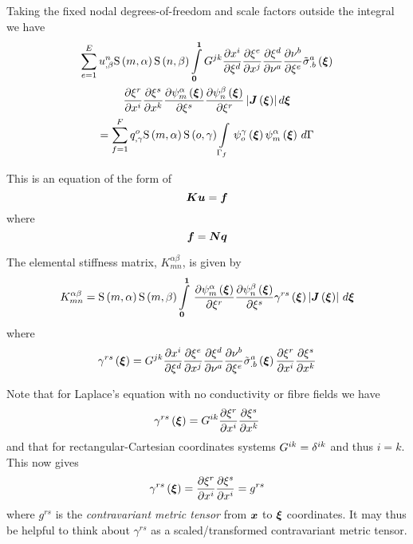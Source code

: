 Taking the fixed nodal degrees-of-freedom and scale factors outside the integral we have
\begin{multline}
  \dsum_{e=1}^{E}\nodedof{u}{n}{\beta}\gsf{m}{\alpha}\gsf{n}{\beta}
  \dintl{\vectr{0}}{\vectr{1}}G^{jk}\delby{x^{i}}{\xi^{d}}
  \delby{\xi^{e}}{x^{j}}\delby{\xi^{d}}{\nu^{a}}
  \delby{\nu^{b}}{\xi^{e}}\fnof{{\tilde{\sigma}}^{a}_{.b}}{\vectr{\xi}} \\
  \delby{\xi^{r}}{x^{i}}\delby{\xi^{s}}{x^{k}}
  \delby{\gbfn{m}{\alpha}{\vectr{\xi}}}{\xi^{s}}
  \delby{\gbfn{n}{\beta}{\vectr{\xi}}}{\xi^{r}}
  \abs{\fnof{\matr{J}}{\vectr{\xi}}}d\vectr{\xi} \\
  = \dsum_{f=1}^{F}\nodedof{q}{o}{\gamma}\gsf{m}{\alpha}\gsf{o}{\gamma}
  \gint{\Gamma_{f}}{}{\gbfn{o}{\gamma}{\vectr{\xi}}\gbfn{m}{\alpha}{\vectr{\xi}}}{\Gamma}
  \label{eqn:elementalfemlhs1}
\end{multline}

This is an equation of the form of
\begin{equation}
  \matr{K}\vect{u}=\vect{f}
\end{equation}
where
\begin{equation}
  \vectr{f}=\matr{N}\vectr{q}
\end{equation}

The elemental stiffness matrix, $K^{\alpha\beta}_{mn}$, is given by
\begin{equation}
  K^{\alpha\beta}_{mn}=\gsf{m}{\alpha}\gsf{m}{\beta}
  \gint{\vectr{0}}{\vectr{1}}{\delby{\gbfn{m}{\alpha}{\vectr{\xi}}}{\xi^{r}}
    \delby{\gbfn{n}{\beta}{\vectr{\xi}}}{\xi^{s}}\fnof{\gamma^{rs}}{\vectr{\xi}}
    \abs{\fnof{\matr{J}}{\vectr{\xi}}}}{\vectr{\xi}}
  \label{eqn:elementalfemlhs2}
\end{equation}
where
\begin{equation}
  \fnof{\gamma^{rs}}{\vectr{\xi}}=G^{jk}\delby{x^{i}}{\xi^{d}}
  \delby{\xi^{e}}{x^{j}}\delby{\xi^{d}}{\nu^{a}}\delby{\nu^{b}}{\xi^{e}}
  \fnof{{\tilde{\sigma}}^{a}_{.b}}{\vectr{\xi}}\delby{\xi^{r}}{x^{i}}\delby{\xi^{s}}{x^{k}}
  \label{eqn:diffusiongammadefinition1}
\end{equation}

Note that for Laplace's equation with no conductivity or fibre fields we have
\begin{equation}
  \fnof{\gamma^{rs}}{\vectr{\xi}}=G^{ik}\delby{\xi^{r}}{x^{i}}\delby{\xi^{s}}{x^{k}}
  \label{eqn:diffusiongammadefinition2}
\end{equation}
and that for rectangular-Cartesian coordinates systems
$G^{ik}=\delta^{{i}{k}}$ and thus $i=k$. This now gives
\begin{equation}
  \fnof{\gamma^{rs}}{\vectr{\xi}}=\delby{\xi^{r}}{x^{i}}\delby{\xi^{s}}{x^{i}}=g^{rs}
  \label{eqn:diffusiongammadefinition3}
\end{equation}
where $g^{rs}$ is the \emph{contravariant metric tensor} from $\boldsymbol{x}$ to
$\boldsymbol{\xi}$ coordinates. It may thus be helpful to think about $\gamma^{rs}$
as a scaled/transformed contravariant metric tensor.

